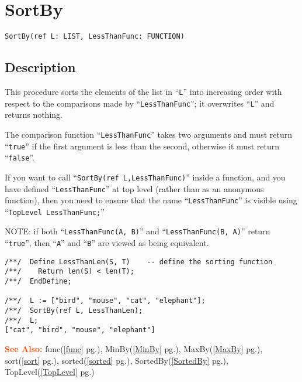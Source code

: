 \documentclass[a4paper]{mybook}
\newenvironment{command}{}{} %
\newcommand\SeeAlso{\par\textcolor{OrangeRed}{\textbf{\large See Also: }}}
\begin{document}
\section{SortBy}
\label{SortBy}
\begin{command} %


\begin{Verbatim}[label=syntax, rulecolor=\color{MidnightBlue},
frame=single]
SortBy(ref L: LIST, LessThanFunc: FUNCTION)
\end{Verbatim}


\subsection*{Description}

This procedure sorts the elements of the list in ``\verb&L&'' into
increasing order with respect to the comparisons made by ``\verb&LessThanFunc&'';
it overwrites ``\verb&L&'' and returns nothing.
\par 
The comparison function ``\verb&LessThanFunc&'' takes two arguments
and must return ``\verb&true&'' if the first argument is less than the
second, otherwise it must return ``\verb&false&''.
\par 
If you want to call ``\verb&SortBy(ref L,LessThanFunc)&'' inside a function, and
you have defined ``\verb&LessThanFunc&'' at top level (rather than as an
anonymous function), then you need to ensure that the name ``\verb&LessThanFunc&''
is visible using ``\verb&TopLevel LessThanFunc;&''
\par 
NOTE: if both ``\verb&LessThanFunc(A, B)&'' and ``\verb&LessThanFunc(B, A)&'' return
``\verb&true&'', then ``\verb&A&'' and ``\verb&B&'' are viewed as being equivalent.
\begin{Verbatim}[label=example, rulecolor=\color{PineGreen}, frame=single]
/**/  Define LessThanLen(S, T)    -- define the sorting function
/**/    Return len(S) < len(T);
/**/  EndDefine;

/**/  L := ["bird", "mouse", "cat", "elephant"];
/**/  SortBy(ref L, LessThanLen);
/**/  L;
["cat", "bird", "mouse", "elephant"]
\end{Verbatim}


\SeeAlso %
  func(\ref{func} pg.\pageref{func}), 
    MinBy(\ref{MinBy} pg.\pageref{MinBy}), 
    MaxBy(\ref{MaxBy} pg.\pageref{MaxBy}), 
    sort(\ref{sort} pg.\pageref{sort}), 
    sorted(\ref{sorted} pg.\pageref{sorted}), 
    SortedBy(\ref{SortedBy} pg.\pageref{SortedBy}), 
    TopLevel(\ref{TopLevel} pg.\pageref{TopLevel})
\end{command} %
\end{document}
